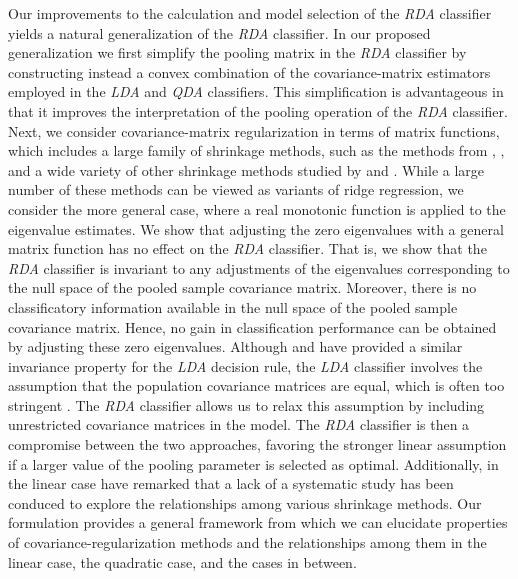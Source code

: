 \documentclass[11pt]{article}
\begin{document}
Our improvements to the calculation and model selection of the \emph{RDA} classifier yields a natural generalization of the \emph{RDA} classifier. In our proposed generalization we first simplify the pooling matrix in the \emph{RDA} classifier by constructing instead a convex combination of the covariance-matrix estimators employed in the \emph{LDA} and \emph{QDA} classifiers. This simplification is advantageous in that it improves the interpretation of the pooling operation of the \emph{RDA} classifier. Next, we consider covariance-matrix regularization in terms of matrix functions, which includes a large family of shrinkage methods, such as the methods from \cite{Srivastava:2007ww}, \cite{Rao:1971ul}, and a wide variety of other shrinkage methods studied by \cite{Ramey:2011ji} and \cite*{Xu:2009fl}. While a large number of these methods can be viewed as variants of ridge regression, we consider the more general case, where a real monotonic function is applied to the eigenvalue estimates. We show that adjusting the zero eigenvalues with a general matrix function has no effect on the \emph{RDA} classifier. That is, we show that the \emph{RDA} classifier is invariant to any adjustments of the eigenvalues corresponding to the null space of the pooled sample covariance matrix. Moreover, there is no classificatory information available in the null space of the pooled sample covariance matrix.  Hence, no gain in classification performance can be obtained by adjusting these zero eigenvalues. Although \cite{Ji:2008wp} and \cite{Ye:2006jm} have provided a similar invariance property for the \emph{LDA} decision rule, the \emph{LDA} classifier involves the assumption that the population covariance matrices are equal, which is often too stringent \citep{Clemmensen:2011kr}. The \emph{RDA} classifier allows us to relax this assumption by including unrestricted covariance matrices in the model. The \emph{RDA} classifier is then a compromise between the two approaches, favoring the stronger linear assumption if a larger value of the pooling parameter is selected as optimal. Additionally, in the linear case  \cite{Ye:2009gd} have remarked that  a lack of a systematic study has been conduced to explore the relationships among various shrinkage methods. Our formulation provides a general framework from which we can elucidate properties of covariance-regularization methods and the relationships among them in the linear case, the quadratic case, and the cases in between.
\end{document}
